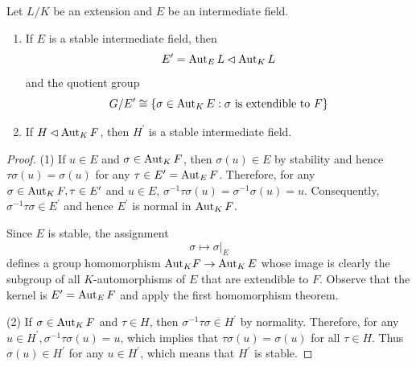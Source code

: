 \begin{theorem}
    \label{thm: The stable intermediate field and normal subgroup of Galois group}
    Let $L/K$ be an extension and $E$ be an intermediate field.
    \begin{enumerate}
        \item
              If $E$ is a stable intermediate field, then
              \begin{equation*}
                  E^\prime=\operatorname{\operatorname{Aut}}_{E} {L} \lhd \operatorname{\operatorname{Aut}}_{ K } {L}
              \end{equation*}
              and the quotient group
              \begin{equation*}
                  G / E' \cong \left\{\sigma \in \operatorname{\operatorname{Aut}}_K E : \sigma \text{ is extendible to } F \right\}
              \end{equation*}
        \item
              If $H\lhd \operatorname{\operatorname{Aut}}_{ K } {F}$, then $H^\prime$ is a stable intermediate field.
    \end{enumerate}

    \begin{proof}
        (1)
        If $u \in E$ and $\sigma\in  \operatorname{\operatorname{Aut}}_K F$, then $\sigma(u)\in  E$ by stability and hence $\tau \sigma(u)=\sigma(u)$ for any $\tau\in  E^\prime=\operatorname{\operatorname{Aut}}_E F$. Therefore, for any $\sigma\in  \operatorname{\operatorname{Aut}}_K F, \tau\in  E^\prime$ and $u\in  E$, $\sigma^{-1} \tau \sigma(u)=\sigma^{-1} \sigma(u)=u$. Consequently, $\sigma^{-1} \tau \sigma\in  E^\prime$ and hence $E^\prime$ is normal in  $\operatorname{\operatorname{Aut}}_K F$.

        Since $E$ is stable, the assignment
        \begin{equation*}
            \sigma \mapsto \left.\sigma \right|_E
        \end{equation*}
        defines a group homomorphism ${\operatorname{\operatorname{Aut}}}_K F \rightarrow \operatorname{\operatorname{Aut}}_K E$ whose image is clearly the subgroup of all $K$-automorphisms of $E$ that are extendible to $F$. Observe that the kernel is $E^\prime=\operatorname{\operatorname{Aut}}_E F$ and apply the first homomorphism theorem.

        (2) If $\sigma\in  \operatorname{\operatorname{Aut}}_K F$ and $\tau\in  H$, then $\sigma^{-1} \tau \sigma\in  H^\prime$ by normality. Therefore, for any $u\in  H^\prime, \sigma^{-1} \tau \sigma(u)=u$, which implies that $\tau \sigma(u)=\sigma(u)$ for all $\tau\in  H$. Thus $\sigma(u) \in H^\prime$ for any $u\in  H^\prime$, which means that $H^\prime$ is stable.
    \end{proof}
\end{theorem}



